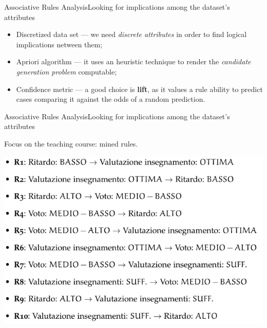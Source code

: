 \begin{frame}{Associative Rules Analysis}{Looking for implications among the dataset's attributes}

 \vspace{0,4cm}

	\begin{block}{}
		\begin{itemize}
			\item<1-> \alert{Discretized data set} --- we need \emph{discrete attributes} in order to find logical implications netween them;
			\item<2-> \alert{Apriori algorithm} --- it uses an heuristic technique to render the \emph{candidate generation problem} computable;
			\item<3-> \alert{Confidence metric} --- a good choice is \textbf{lift}, as it values a rule ability to predict cases comparing it against the odds of a random prediction.
		\end{itemize}
	\end{block}

\end{frame}

\begin{frame}{Associative Rules Analysis}{Looking for implications among the dataset's attributes}

    Focus on the \alert{teaching course}: mined rules.

    \vspace{0.4cm}
    \begin{centering}
        \hspace{0.5cm}\includegraphics[scale=0.40]{ass2.png}
    \end{centering}

\end{frame}

